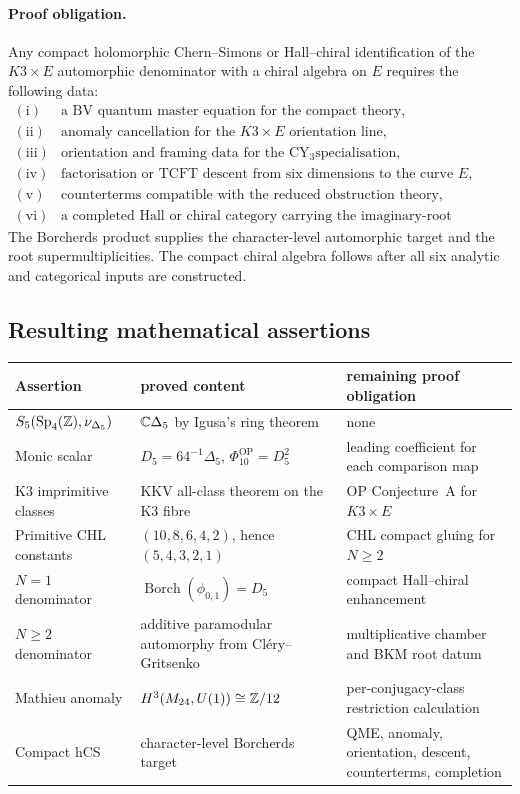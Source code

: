 \paragraph{Proof obligation.}
Any compact holomorphic Chern--Simons or Hall--chiral identification of the
\(K3\times E\) automorphic denominator with a chiral algebra on \(E\)
requires the following data:
\[
\begin{array}{ll}
\mathrm{(i)}&\text{a BV quantum master equation for the compact theory,}\\
\mathrm{(ii)}&\text{anomaly cancellation for the \(K3\times E\) orientation
line,}\\
\mathrm{(iii)}&\text{orientation and framing data for the CY\(_3\)
specialisation,}\\
\mathrm{(iv)}&\text{factorisation or TCFT descent from six dimensions to
the curve \(E\),}\\
\mathrm{(v)}&\text{counterterms compatible with the reduced
obstruction theory,}\\
\mathrm{(vi)}&\text{a completed Hall or chiral category carrying the
imaginary-root multiplicities.}
\end{array}
\]
The Borcherds product supplies the character-level automorphic target and
the root supermultiplicities.  The compact chiral algebra follows after
all six analytic and categorical inputs are constructed.

\subsection*{Resulting mathematical assertions}
\label{subsec:conj1-resulting-assertions}

\begin{center}
\renewcommand{\arraystretch}{1.18}
\begin{tabular}{@{}lll@{}}
\hline
Assertion & proved content & remaining proof obligation \\
\hline
\(S_5(\mathrm{Sp}_4(\mathbb{Z}),\nu_{\Delta_5})\) &
\(\mathbb{C}\Delta_5\) by Igusa's ring theorem &
none \\
Monic scalar &
\(D_5=64^{-1}\Delta_5\), \(\Phi_{10}^{\mathrm{OP}}=D_5^2\) &
leading coefficient for each comparison map \\
K3 imprimitive classes &
KKV all-class theorem on the K3 fibre &
OP Conjecture~A for \(K3\times E\) \\
Primitive CHL constants &
\((10,8,6,4,2)\), hence \((5,4,3,2,1)\) &
CHL compact gluing for \(N\geq2\) \\
\(N=1\) denominator &
\(\operatorname{Borch}(\phi_{0,1})=D_5\) &
compact Hall--chiral enhancement \\
\(N\geq2\) denominator &
additive paramodular automorphy from Cl\'ery--Gritsenko &
multiplicative chamber and BKM root datum \\
Mathieu anomaly &
\(H^3(M_{24},U(1))\cong\mathbb{Z}/12\) &
per-conjugacy-class restriction calculation \\
Compact hCS &
character-level Borcherds target &
QME, anomaly, orientation, descent, counterterms, completion \\
\hline
\end{tabular}
\end{center}


